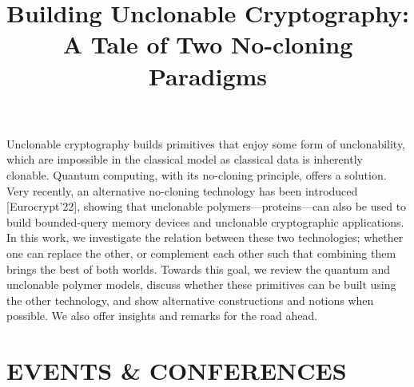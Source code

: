 \documentclass[margin]{res}
\begin{document}
\begin{resume}
\location{}
\vspace{1mm}
\title{\textbf{Building Unclonable Cryptography: A Tale of Two No-cloning Paradigms}}
\begin{position}
Unclonable cryptography builds primitives that enjoy some form of unclonability, which are impossible in the classical model as classical data is inherently clonable. Quantum computing, with its no-cloning principle, offers a solution. Very recently, an alternative no-cloning technology has been introduced [Eurocrypt'22], showing that unclonable polymers---proteins---can also be used to build bounded-query memory devices and unclonable cryptographic applications. In this work, we investigate the relation between these two technologies; whether one can replace the other, or complement each other such that combining them brings the best of both worlds. Towards this goal, we review the quantum and unclonable polymer models, discuss whether these primitives can be built using the other technology, and show alternative constructions and notions when possible. We also offer insights and remarks for the road ahead. 
\end{position}




\iffalse
\section{RELEVANT COURSEWORK}
\par
\textbf{Mathematics}:
Linear Algebra, Algebra, Real Analysis, Probability Theory, Combinatorics, Measure Theory, Ordinary Differential Equations, Complex Analysis, Commutative Algebra \& Galois Theory, Partial Differential Equations, Functional Analysis

\par
\textbf{Computer Science}:
Algorithms and Programming, Automata Theory And Computability, Computational Complexity Theory, Theoretical Foundations of Cryptography, Discrete Mathematics, Design and Analysis of Algorithms, Approximation Algorithms, Randomness in Cryptography, Fundamentals of Computer Networks, Data Science Fundamentals

\par
\textbf{Miscellaneous}:
Foundations of Data Sciences, Information Theory, Concentration Inequalities, Information \& Communication Complexity
\fi


\iffalse

\section{EVENTS \& CONFERENCES}


\end{resume}
\end{document}
